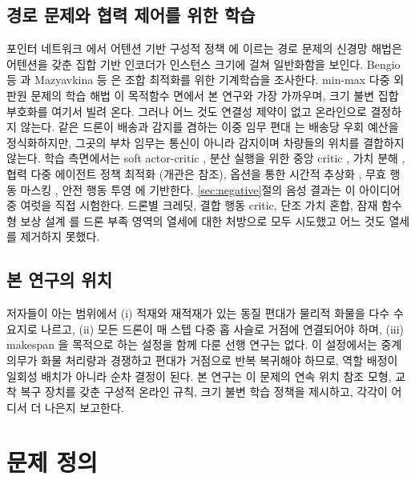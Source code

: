 \documentclass[final,5p,times,twocolumn]{elsarticle}
\begin{document}
\subsection{경로 문제와 협력 제어를 위한 학습}
\label{sec:rel-learning}
포인터 네트워크 \cite{vinyals2015}에서 어텐션 기반 구성적 정책 \cite{nazari2018,kool2019}에
이르는 경로 문제의 신경망 해법은 어텐션을 갖춘 집합 기반 인코더가 인스턴스 크기에 걸쳐 일반화함을
보인다. Bengio 등 \cite{bengio2021}과 Mazyavkina 등 \cite{mazyavkina2021}은 조합 최적화를 위한
기계학습을 조사한다. min-max 다중 외판원 문제의 학습 해법 \cite{park2023,guo2024}이 목적함수 면에서
본 연구와 가장 가까우며, 크기 불변 집합 부호화를 여기서 빌려 온다. 그러나 어느 것도 연결성 제약이
없고 온라인으로 결정하지 않는다. 같은 드론이 배송과 감지를 겸하는 이중 임무 편대 \cite{zhu2026}는
배송당 우회 예산을 정식화하지만, 그곳의 부차 임무는 통신이 아니라 감지이며 차량들의 위치를
결합하지 않는다. 학습 측면에서는 soft actor-critic \cite{haarnoja2018}, 분산 실행을 위한 중앙
critic \cite{lowe2017,foerster2018}, 가치 분해 \cite{sunehag2018,rashid2018}, 협력 다중 에이전트
정책 최적화 \cite{yu2022}(개관은 \cite{oroojlooy2023} 참조), 옵션을 통한 시간적 추상화
\cite{sutton1999,bacon2017,vezhnevets2017}, 무효 행동 마스킹 \cite{huang2022}, 안전 행동 투영
\cite{dalal2018}에 기반한다. \ref{sec:negative}절의 음성 결과는 이 아이디어 중 여럿을 직접
시험한다. 드론별 크레딧, 결합 행동 critic, 단조 가치 혼합, 잠재 함수형 보상 설계 \cite{ng1999}를
드론 부족 영역의 열세에 대한 처방으로 모두 시도했고 어느 것도 열세를 제거하지 못했다.

\subsection{본 연구의 위치}
\label{sec:rel-position}
저자들이 아는 범위에서 (i) 적재와 재적재가 있는 동질 편대가 물리적 화물을 다수 수요지로 나르고,
(ii) 모든 드론이 매 스텝 다중 홉 사슬로 거점에 연결되어야 하며, (iii) makespan 을 목적으로 하는
설정을 함께 다룬 선행 연구는 없다. 이 설정에서는 중계 의무가 화물 처리량과 경쟁하고 편대가
거점으로 반복 복귀해야 하므로, 역할 배정이 일회성 배치가 아니라 순차 결정이 된다. 본 연구는 이
문제의 연속 위치 참조 모형, 교착 복구 장치를 갖춘 구성적 온라인 규칙, 크기 불변 학습
정책을 제시하고, 각각이 어디서 더 나은지 보고한다.

\section{문제 정의}
\label{sec:problem}
\end{document}

